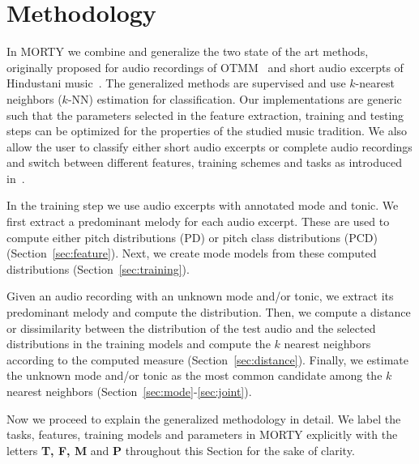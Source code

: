 \documentclass{sig-alternate}
\begin{document}
\section{Methodology}\label{sec:methodology}

In MORTY we combine and generalize the two state of the art methods, originally proposed for audio recordings of OTMM~\cite{bozkurt_tonic,bozkurt_makam} and short audio excerpts of Hindustani music~\cite{chordia}. The generalized methods are supervised and use $k$-nearest neighbors ($k$-NN) estimation for classification. Our implementations are generic such that the parameters selected in the feature extraction, training and testing steps can be optimized for the properties of the studied music tradition. We also allow the user to classify either short audio excerpts or complete audio recordings and switch between different features, training schemes and tasks as introduced in~\cite{bozkurt_tonic, chordia, bozkurt_makam}. %

In the training step we use audio excerpts with annotated mode and tonic. We first extract a predominant me\-lody for each audio excerpt. These are used to compute either pitch distributions (PD) or pitch class distributions (PCD) (Section~\ref{sec:feature}). Next, we create mode models from these computed distributions (Section~\ref{sec:training}). 

Given an audio recording with an unknown mode and/or tonic, we extract its predominant melody and compute the distribution. Then, we compute a distance or dissimilarity between the distribution of the test audio and the selected distributions in the training models and compute the $k$ nearest neighbors according to the computed measure (Section~\ref{sec:distance}). Finally, we estimate the unknown mode and/or tonic as the most common candidate among the $k$ nearest neighbors (Section~\ref{sec:mode}-\ref{sec:joint}).

Now we proceed to explain the generalized methodology in detail. We label the tasks, features, training models and parameters in MORTY explicitly with the letters {\bf T, F, M} and {\bf P} throughout this Section for the sake of clarity.
\end{document}
